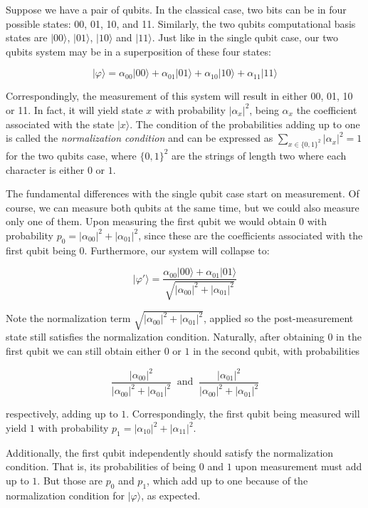 Suppose we have a pair of qubits. In the classical case, two bits can be in four possible states: 00, 01, 10, and 11. Similarly, the two qubits computational basis states are $|00\rangle$, $|01\rangle$, $|10\rangle$ and $|11\rangle$. Just like in the single qubit case, our two qubits system may be in a superposition of these four states:

$$ |\varphi\rangle = \alpha_{00} |00\rangle + \alpha_{01} |01\rangle + \alpha_{10} |10\rangle + \alpha_{11} |11\rangle $$

Correspondingly, the measurement of this system will result in either 00, 01, 10 or 11. In fact, it will yield state $x$ with probability $|\alpha_x|^2$, being $\alpha_x$ the coefficient associated with the state $|x\rangle$. The condition of the probabilities adding up to one is called the \emph{normalization condition} and can be expressed as $\sum_{x \in \{0,1\}^2} |\alpha_x|^2 = 1$ for the two qubits case, where $\{0,1\}^2$ are the strings of length two where each character is either $0$ or $1$.

The fundamental differences with the single qubit case start on measurement. Of course, we can measure both qubits at the same time, but we could also measure only one of them. Upon measuring the first qubit we would obtain $0$ with probability $p_0 = |\alpha_{00}|^2 + |\alpha_{01}|^2$, since these are the coefficients associated with the first qubit being $0$. Furthermore, our system will collapse to:

$$ |\varphi'\rangle = \frac{ \alpha_{00} |00\rangle + \alpha_{01} |01\rangle }{ \sqrt{|\alpha_{00}|^2 + |\alpha_{01}|^2} } $$

Note the normalization term $\sqrt{|\alpha_{00}|^2 + |\alpha_{01}|^2}$, applied so the post-measurement state still satisfies the normalization condition. Naturally, after obtaining $0$ in the first qubit we can still obtain either $0$ or $1$ in the second qubit, with probabilities 

$$ \frac{ |\alpha_{00}|^2 }{ |\alpha_{00}|^2 + |\alpha_{01}|^2 }  \ \text{ and } \ 
\frac{ |\alpha_{01}|^2 }{ |\alpha_{00}|^2 + |\alpha_{01}|^2 } $$

respectively, adding up to $1$. Correspondingly, the first qubit being measured will yield $1$ with probability $p_1 = |\alpha_{10}|^2 + |\alpha_{11}|^2$.

Additionally, the first qubit independently should satisfy the normalization condition. That is, its probabilities of being $0$ and $1$ upon measurement must add up to $1$. But those are $p_0$ and $p_1$, which add up to one because of the normalization condition for $|\varphi\rangle$, as expected.

